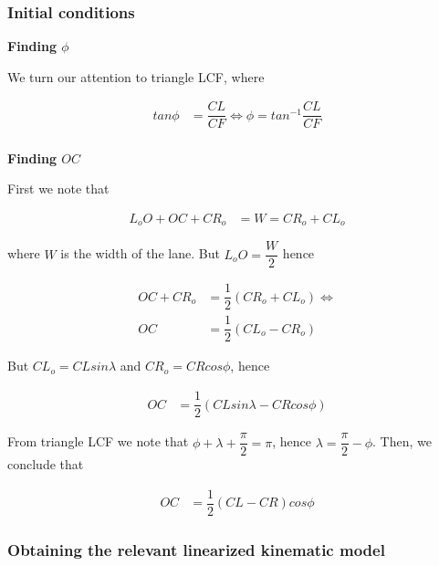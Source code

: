 \documentclass[oneside,12pt]{article}
\begin{document}
    \begin{figure}[H]\centering
      \scalebox{1}{}
      \caption{}
      \label{fig:centerline_mpc}
    \end{figure}


    \subsubsection{Initial conditions}

    \textbf{Finding $\phi$}

    We turn our attention to triangle LCF, where

    \begin{align}
      tan\phi &= \dfrac{CL}{CF} \Leftrightarrow \phi = tan^{-1} \dfrac{CL}{CF} \\
    \end{align}


    \textbf{Finding $OC$}

    First we note that

    \begin{align}
      L_o O + OC + CR_o &= W = CR_o + CL_o
    \end{align}

    where $W$ is the width of the lane. But $L_o O = \dfrac{W}{2}$ hence

    \begin{align}
      OC + CR_o &= \dfrac{1}{2}(CR_o + CL_o) \Leftrightarrow \\
      OC &= \dfrac{1}{2}(CL_o - CR_o)
    \end{align}

    But $CL_o = CL sin\lambda$ and $CR_o = CR cos\phi$, hence


    \begin{align}
      OC &= \dfrac{1}{2}(CL sin\lambda - CR cos\phi)
    \end{align}

    From triangle LCF we note that $\phi + \lambda + \dfrac{\pi}{2} = \pi$,
    hence $\lambda = \dfrac{\pi}{2} - \phi$. Then, we conclude that

    \begin{align}
      OC &= \dfrac{1}{2}(CL - CR) cos\phi
    \end{align}




    \subsubsection{Obtaining the relevant linearized kinematic model}
\end{document}
